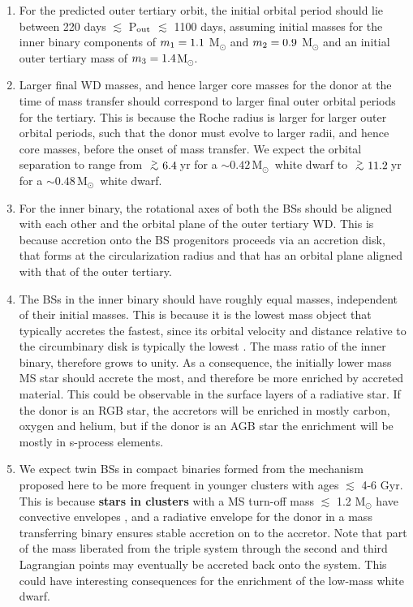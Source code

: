 \documentclass[twocolumn]{aastex62}
\newcommand{\MSun}{\mbox{M$_\odot$}}
\def\apgt{\ {\raise-.5ex\hbox{$\buildrel>\over\sim$}}\ }
\begin{document}
\begin{enumerate}

\item For the predicted outer tertiary orbit, the initial orbital
  period should lie between 220 days $\lesssim$ P$_{\rm out}$
  $\lesssim$ 1100 days, assuming initial masses for the inner binary
  components of $m_{\rm 1} = 1.1$ M$_{\odot}$ and $m_{\rm 2} = 0.9$
  M$_{\odot}$ and an initial outer tertiary mass of $m_{\rm 3} = 1.4
  $M$_{\odot}$.

\item Larger final WD masses, and hence larger core masses for the
  donor at the time of mass transfer should correspond to larger final
  outer orbital periods for the tertiary.  This is because the Roche
  radius is larger for larger outer orbital periods, such that the
  donor must evolve to larger radii, and hence core masses, before the
  onset of mass transfer. We expect the orbital separation to range
  from $\apgt 6.4$\,yr for a $\sim 0.42$\,\MSun\, white dwarf to
  $\apgt 11.2$\,yr for a $\sim 0.48$\,\MSun\, white dwarf.

\item For the inner binary, the rotational axes of both the BSs should
  be aligned with each other and the orbital plane of the outer
  tertiary WD.  This is because accretion onto the BS progenitors
  proceeds via an accretion disk, that forms at the circularization
  radius and that has an orbital plane aligned with that of the outer
  tertiary.

\item The BSs in the inner binary should have roughly equal masses,
  independent of their initial masses.  This is because it is the
  lowest mass object that typically accretes the fastest, since its
  orbital velocity and distance relative to the circumbinary disk is
  typically the lowest
  \citep[e.g.][]{2000MNRAS.314...33B,2012ApJ...749..118S,2017MNRAS.466.1170M}.
  The mass ratio of the inner binary, therefore grows to unity.  As a
  consequence, the initially lower mass MS star should accrete the
  most, and therefore be more enriched by accreted material.  This
  could be observable in the surface layers of a radiative star.  If
  the donor is an RGB star, the accretors will be enriched in mostly
  carbon, oxygen and helium, but if the donor is an AGB star the
  enrichment will be mostly in s-process elements.
    
\item We expect twin BSs in compact binaries formed from the mechanism
  proposed here to be more frequent in younger clusters with ages
  $\lesssim$ 4-6 Gyr.  This is because \textbf{stars in clusters} with a MS turn-off
  mass $\lesssim$ 1.2 M$_{\odot}$ have convective envelopes
  \citep[e.g.][]{1991ApJS...76...55I,2009pfer.book.....M}, and a
  radiative envelope for the donor in a mass transferring binary
  ensures stable accretion on to the accretor.  Note that part of the
  mass liberated from the triple system through the second and third
  Lagrangian points may eventually be accreted back onto the system.
  This could have interesting consequences for the enrichment of the
  low-mass white dwarf.


\end{enumerate}
\end{document}
